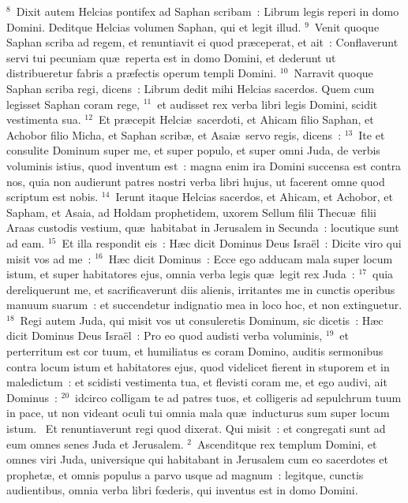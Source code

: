 ${}^{8}$~Dixit autem Helcias pontifex ad Saphan scribam~: Librum legis reperi in domo Domini. Deditque Helcias volumen Saphan, qui et legit illud.
${}^{9}$~Venit quoque Saphan scriba ad regem, et renuntiavit ei quod pr\ae ceperat, et ait~: Conflaverunt servi tui pecuniam qu\ae\ reperta est in domo Domini, et dederunt ut distribueretur fabris a pr\ae fectis operum templi Domini.
${}^{10}$~Narravit quoque Saphan scriba regi, dicens~: Librum dedit mihi Helcias sacerdos. Quem cum legisset Saphan coram rege,
${}^{11}$~et audisset rex verba libri legis Domini, scidit vestimenta sua.
${}^{12}$~Et pr\ae cepit Helci\ae\ sacerdoti, et Ahicam filio Saphan, et Achobor filio Micha, et Saphan scrib\ae , et Asai\ae\ servo regis, dicens~:
${}^{13}$~Ite et consulite Dominum super me, et super populo, et super omni Juda, de verbis voluminis istius, quod inventum est~: magna enim ira Domini succensa est contra nos, quia non audierunt patres nostri verba libri hujus, ut facerent omne quod scriptum est nobis.
${}^{14}$~Ierunt itaque Helcias sacerdos, et Ahicam, et Achobor, et Sapham, et Asaia, ad Holdam prophetidem, uxorem Sellum filii Thecu\ae\ filii Araas custodis vestium, qu\ae\ habitabat in Jerusalem in Secunda~: locutique sunt ad eam.
${}^{15}$~Et illa respondit eis~: H\ae c dicit Dominus Deus Isra\"el~: Dicite viro qui misit vos ad me~:
${}^{16}$~H\ae c dicit Dominus~: Ecce ego adducam mala super locum istum, et super habitatores ejus, omnia verba legis qu\ae\ legit rex Juda~:
${}^{17}$~quia dereliquerunt me, et sacrificaverunt diis alienis, irritantes me in cunctis operibus manuum suarum~: et succendetur indignatio mea in loco hoc, et non extinguetur.
${}^{18}$~Regi autem Juda, qui misit vos ut consuleretis Dominum, sic dicetis~: H\ae c dicit Dominus Deus Isra\"el~: Pro eo quod audisti verba voluminis,
${}^{19}$~et perterritum est cor tuum, et humiliatus es coram Domino, auditis sermonibus contra locum istum et habitatores ejus, quod videlicet fierent in stuporem et in maledictum~: et scidisti vestimenta tua, et flevisti coram me, et ego audivi, ait Dominus~:
${}^{20}$~idcirco colligam te ad patres tuos, et colligeris ad sepulchrum tuum in pace, ut non videant oculi tui omnia mala qu\ae\ inducturus sum super locum istum.
~Et renuntiaverunt regi quod dixerat. Qui misit~: et congregati sunt ad eum omnes senes Juda et Jerusalem.
${}^{2}$~Ascenditque rex templum Domini, et omnes viri Juda, universique qui habitabant in Jerusalem cum eo sacerdotes et prophet\ae , et omnis populus a parvo usque ad magnum~: legitque, cunctis audientibus, omnia verba libri fœderis, qui inventus est in domo Domini.
